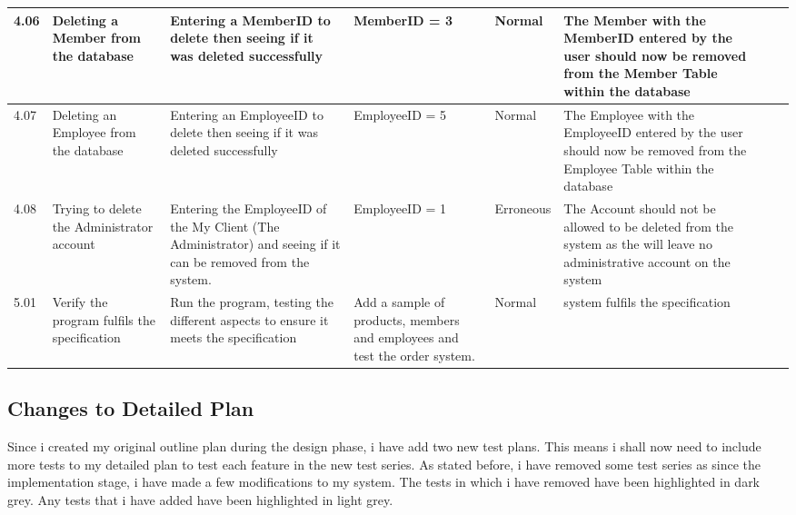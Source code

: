 \begin{landscape}
\begin{flushleft}
\begin{longtable}{|p{1.5cm}|p{2.5cm}|p{2.5cm}|p{2cm}|p{2cm}|p{2cm}|p{2cm}|p{2cm}|}
	4.06 & Deleting a Member from the database &  Entering a MemberID to delete then seeing if it was deleted successfully & MemberID = 3 & Normal & The Member with the MemberID entered by the user should now be removed from the Member Table within the database && \\ \hline
	4.07 & Deleting an Employee from the database &  Entering an EmployeeID to delete then seeing if it was deleted successfully & EmployeeID = 5 & Normal & The Employee with the EmployeeID entered by the user should now be removed from the Employee Table within the database && \\ \hline
	4.08 & Trying to delete the Administrator account  & Entering the EmployeeID of the My Client (The Administrator) and seeing if it can be removed from the system. & EmployeeID = 1 & Erroneous & The Account should not be allowed to be deleted from the system as the will leave no administrative account on the system && \\ \hline
	5.01 & Verify the program fulfils the specification & Run the program, testing the different aspects to ensure it meets the specification & Add a sample of products, members and employees and test the order system.  & Normal &system fulfils the specification & & \\ \hline

\end{longtable}
\end{flushleft}

\subsection{Changes to Detailed Plan}

Since i created my original outline plan during the design phase, i have add two new test plans. This means i shall now need to include more tests to my detailed plan to test each feature in the new test series. As stated before, i have removed some test series as since the implementation stage, i have made a few modifications to my system. The tests in which i have removed have been highlighted in dark grey. Any tests that i have added have been highlighted in light grey.


\end{landscape}
